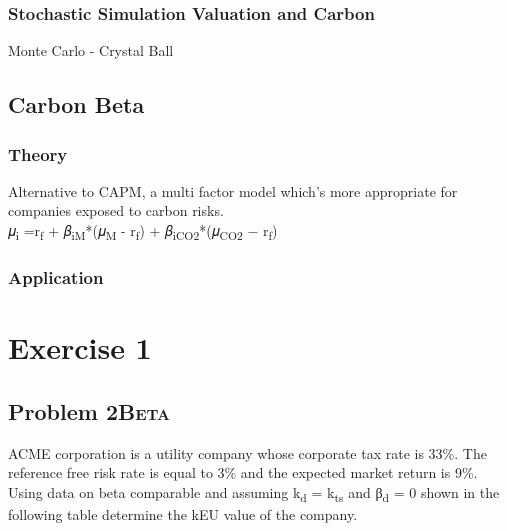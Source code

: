 \documentclass[11pt]{article}
\begin{document}
\subsubsection*{Stochastic Simulation Valuation and Carbon}
\label{sec:org6f2b4bd}
Monte Carlo - Crystal Ball\\
\subsection*{Carbon Beta}
\label{sec:org160605c}
\subsubsection*{Theory}
\label{sec:org07229b4}
Alternative to CAPM, a multi factor model which's more appropriate for companies exposed to carbon risks.\\
𝜇\textsubscript{i} =r\textsubscript{f} + 𝛽\textsubscript{iM}*(𝜇\textsubscript{M} - r\textsubscript{f}) + 𝛽\textsubscript{iCO2}*(𝜇\textsubscript{CO2} − r\textsubscript{f})\\
\subsubsection*{Application}
\label{sec:org2263f26}

\section*{Exercise 1}
\label{sec:orgb98afc1}
\subsection*{Problem 2\hfill{}\textsc{Beta}}
\label{sec:orgee2fba1}
ACME corporation is a utility company whose corporate tax rate is 33\%. The reference free risk rate is equal to 3\% and the expected market return is 9\%. Using data on beta comparable and assuming k\textsubscript{d} = k\textsubscript{ts} and β\textsubscript{d} = 0 shown in the following table determine the kEU value of the company.\\
\end{document}
